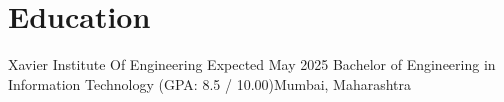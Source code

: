 \section{Education}
    \resumeSubHeadingListStart

    \resumeSubheading
    {Xavier Institute Of Engineering }{Expected May 2025}
    {Bachelor of Engineering in Information Technology  (GPA: 8.5 / 10.00)}{Mumbai, Maharashtra}

    \resumeSubHeadingListEnd